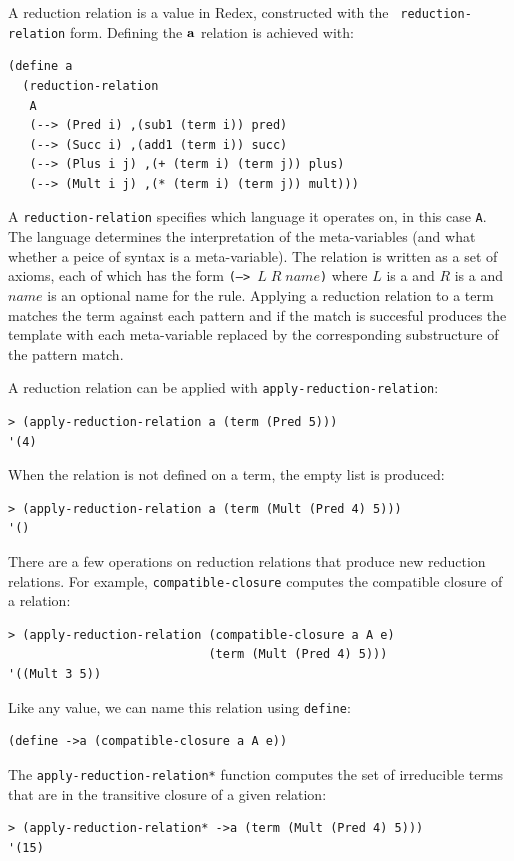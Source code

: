 A reduction relation is a value in Redex, constructed with the {\tt
  reduction-relation} form.  Defining the $\mathbf{a}$ relation is
achieved with:
\begin{verbatim}
(define a
  (reduction-relation
   A
   (--> (Pred i) ,(sub1 (term i)) pred)
   (--> (Succ i) ,(add1 (term i)) succ)
   (--> (Plus i j) ,(+ (term i) (term j)) plus)
   (--> (Mult i j) ,(* (term i) (term j)) mult)))
\end{verbatim}
A {\tt reduction-relation} specifies which language it operates on, in
this case {\tt A}.  The language determines the interpretation of the
meta-variables (and what whether a peice of syntax is a
meta-variable).  The relation is written as a set of axioms, each of
which has the form {\tt (--> $L\;R\;\mathit{name}$)} where $L$ is a
 and $R$ is a  and $\mathit{name}$
is an optional name for the rule.  Applying a reduction relation to a
term matches the term against each pattern and if the match is
succesful produces the template with each meta-variable replaced by
the corresponding substructure of the pattern match.

A reduction relation can be applied with {\tt apply-reduction-relation}:
\begin{verbatim}
> (apply-reduction-relation a (term (Pred 5)))
'(4)
\end{verbatim}
When the relation is not defined on a term, the empty list is produced:
\begin{verbatim}
> (apply-reduction-relation a (term (Mult (Pred 4) 5)))
'()
\end{verbatim}

There are a few operations on reduction relations that produce new
reduction relations.  For example, {\tt compatible-closure} computes
the compatible closure of a relation:
\begin{verbatim}
> (apply-reduction-relation (compatible-closure a A e)
                            (term (Mult (Pred 4) 5)))
'((Mult 3 5))
\end{verbatim}
Like any value, we can name this relation using {\tt define}:
\begin{verbatim}
(define ->a (compatible-closure a A e))
\end{verbatim}
The {\tt apply-reduction-relation*} function computes the set of
irreducible terms that are in the transitive closure of a given
relation:
\begin{verbatim}
> (apply-reduction-relation* ->a (term (Mult (Pred 4) 5)))
'(15)
\end{verbatim}

